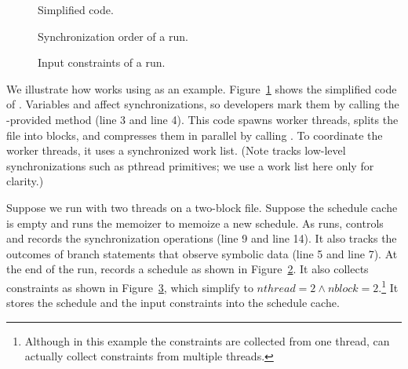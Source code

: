 \begin{figure}[t]
\centering \tiny {}
\caption{\small Simplified \pbzip code.}
\label{fig:tern-pbzip2}
\end{figure}

\begin{figure}[t]
\centering
\begin{minipage}[c]{.8\linewidth}
\tiny {}
\end{minipage}
\caption{\small Synchronization order of a \pbzip run.}
\label{fig:tern-pbzip2-sync-order}
\end{figure}

\begin{figure}[t]
\centering
\begin{minipage}[c]{0.4\linewidth}
\tiny {}
\end{minipage}
\caption{\small Input constraints of a \pbzip run.}
\label{fig:tern-pbzip2-constraints}
\end{figure}

We illustrate how \tern works using \pbzip as an example.
Figure~\ref{fig:tern-pbzip2} shows the simplified code of \pbzip.  Variables
 and  affect synchronizations, so developers mark
them by calling the \tern-provided method  (line 3 and line 4). 
This
code spawns  worker threads, splits the file into 
blocks, and compresses them in parallel by calling .  To
coordinate the worker threads, it uses a synchronized work list. (Note \tern
tracks
low-level synchronizations such as pthread primitives; we use a work list
here only for clarity.)

Suppose we run \pbzip with two threads on a two-block file.  Suppose the
schedule cache is empty and \tern runs the memoizer to memoize a new
schedule.  As \pbzip runs, \tern controls and records the synchronization
operations (line 9 and line 14).  It also tracks the outcomes of branch
statements that observe symbolic data (line 5 and line 7).  At the end of the
run, \tern records a schedule as shown in
Figure~\ref{fig:tern-pbzip2-sync-order}.  It also collects constraints as shown
in Figure~\ref{fig:tern-pbzip2-constraints}, which simplify to $nthread=2
\wedge nblock=2$.\footnote{Although in this example the constraints are
  collected from one thread, \tern can actually collect constraints from
  multiple threads.}  It stores the schedule and the input constraints
into the schedule cache.

